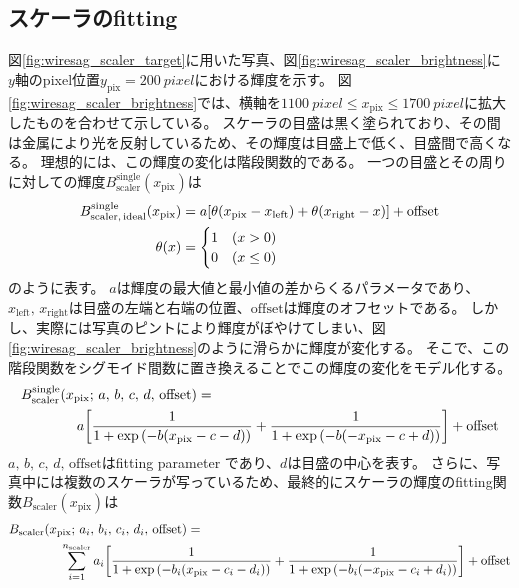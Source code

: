 \documentclass[../../main.tex]{subfiles}
\begin{document}
\subsection{スケーラのfitting}
図\ref{fig:wiresag_scaler_target}に用いた写真、図\ref{fig:wiresag_scaler_brightness}に
$y$軸のpixel位置$y_{\mathrm{pix}}=\SI{200}{pixel}$における輝度を示す。
図\ref{fig:wiresag_scaler_brightness}では、横軸を$\SI{1100}{pixel} \leq x_{\mathrm{pix}} \leq \SI{1700}{pixel}$に拡大したものを合わせて示している。
スケーラの目盛は黒く塗られており、その間は金属により光を反射しているため、その輝度は目盛上で低く、目盛間で高くなる。
理想的には、この輝度の変化は階段関数的である。
一つの目盛とその周りに対しての輝度$B_{\mathrm{scaler}}^{\mathrm{single}}(x_{\mathrm{pix}})$は
\begin{align}
    B_{\mathrm{scaler,\,ideal}}^{\mathrm{single}}(x_{\mathrm{pix}}) &= a\qty[\theta(x_{\mathrm{pix}}-x_{\mathrm{left}})+\theta(x_{\mathrm{right}}-x)] + \mathrm{offset} \\
    \theta(x) &= \begin{cases}
        1 & (x>0) \\
        0 & (x\leq 0)
    \end{cases}
\end{align}
のように表す。
$a$は輝度の最大値と最小値の差からくるパラメータであり、$x_{\mathrm{left}},\,x_{\mathrm{right}}$は目盛の左端と右端の位置、$\mathrm{offset}$は輝度のオフセットである。
しかし、実際には写真のピントにより輝度がぼやけてしまい、図\ref{fig:wiresag_scaler_brightness}のように滑らかに輝度が変化する。
そこで、この階段関数をシグモイド間数に置き換えることでこの輝度の変化をモデル化する。
\begin{align}
    &B_{\mathrm{scaler}}^{\mathrm{single}}(x_{\mathrm{pix}};\,a,\,b,\,c,\,d,\,\mathrm{offset}) = \notag \\
        &\qquad\qquad a\qty[\dfrac{1}{1+\exp\qty(-b\qty(x_{\mathrm{pix}}-c-d))} + \dfrac{1}{1+\exp\qty(-b\qty(-x_{\mathrm{pix}}-c+d))}] + \mathrm{offset}
\end{align}
$a,\,b,\,c,\,d,\,\mathrm{offset}$はfitting parameter であり、$d$は目盛の中心を表す。
さらに、写真中には複数のスケーラが写っているため、最終的にスケーラの輝度のfitting関数$B_{\mathrm{scaler}}(x_{\mathrm{pix}})$は
\begin{align}
    &B_{\mathrm{scaler}}(x_{\mathrm{pix}};\,a_i,\,b_i,\,c_i,\,d_i,\,\text{offset}) = \notag\\
    &\qquad\qquad\sum_{i=1}^{n_{\mathrm{scaler}}} a_i\qty[\dfrac{1}{1+\exp\qty(-b_i\qty(x_{\mathrm{pix}}-c_i-d_i))} + \dfrac{1}{1+\exp\qty(-b_i\qty(-x_{\mathrm{pix}}-c_i+d_i))}] + \mathrm{offset}
\end{align}
\end{document}
